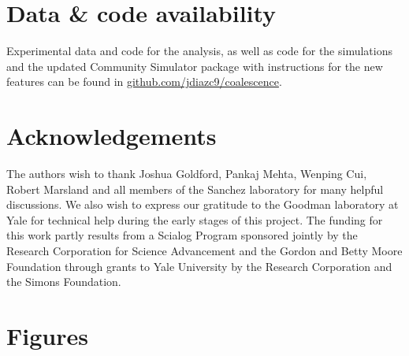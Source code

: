 \documentclass[a4paper,10pt]{article}
\begin{document}
\section*{Data \& code availability}\label{datacode}

Experimental data and code for the analysis, as well as code for the simulations
and the updated Community Simulator package with instructions for the
new features can be found in \url{github.com/jdiazc9/coalescence}.

\section*{Acknowledgements}

The authors wish to thank Joshua Goldford, Pankaj Mehta, Wenping Cui,
Robert Marsland and all members of the Sanchez laboratory
for many helpful discussions.
We also wish to express our gratitude to the Goodman laboratory at Yale
for technical help during the early stages of this project.
The funding for this work partly results from a Scialog Program
sponsored jointly by the Research Corporation for Science Advancement and
the Gordon and Betty Moore Foundation through grants to Yale University by the
Research Corporation and the Simons Foundation.

\clearpage

\clearpage



\clearpage

\section*{Figures}\label{figs}
\end{document}
